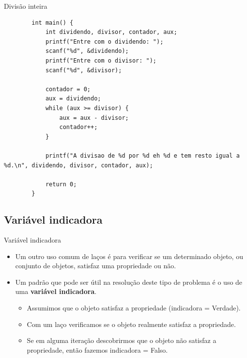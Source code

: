 \documentclass[handout]{beamer}
\begin{document}
\begin{frame}[fragile]{Divisão inteira}

    \begin{verbatim}
        int main() {
            int dividendo, divisor, contador, aux;
            printf("Entre com o dividendo: ");
            scanf("%d", &dividendo);
            printf("Entre com o divisor: ");
            scanf("%d", &divisor);
            
            contador = 0;
            aux = dividendo;
            while (aux >= divisor) {
                aux = aux - divisor;
                contador++;
            }

            printf("A divisao de %d por %d eh %d e tem resto igual a %d.\n", dividendo, divisor, contador, aux);

            return 0;
        }
    \end{verbatim}
\end{frame}

\subsection{Variável indicadora}%

\begin{frame}{Variável indicadora}

    \begin{itemize}[<+->]
        \item Um outro uso comum de laços é para verificar se um determinado objeto, ou conjunto de objetos, satisfaz uma propriedade ou não.
        \item Um padrão que pode ser útil na resolução deste tipo de problema é o uso de uma {\bf variável indicadora}.

        \begin{itemize}
            \item Assumimos que o objeto satisfaz a propriedade (indicadora = Verdade).
            \item Com um laço verificamos se o objeto realmente satisfaz a propriedade.
            \item Se em alguma iteração descobrirmos que o objeto não satisfaz a propriedade, então fazemos indicadora = Falso.
        \end{itemize}
    \end{itemize}
\end{frame}
\end{document}
